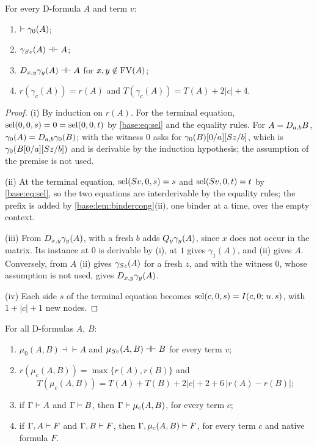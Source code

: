 \begin{lemma}
\label{base:lem:agate}
For every D-formula $A$ and term $v$:
\begin{enumerate}[label=\textup{(\roman*)}]
\item $\vdash\gamma_0(A)$;
\item $\gamma_{S v}(A)\dashv\vdash A$;
\item $D_{x,y}\gamma_y(A)\dashv\vdash A$ for $x,y\notin\operatorname{FV}(A)$;
\item $r(\gamma_c(A))=r(A)$ and $T(\gamma_c(A))=T(A)+2|c|+4$.
\end{enumerate}
\end{lemma}

\begin{proof}
(i) By induction on $r(A)$.  For the terminal equation,
$\operatorname{sel}(0,0,s)=0=\operatorname{sel}(0,0,t)$ by \eqref{base:eq:sel} and the equality rules.
For $A=D_{a,b}B$, $\gamma_0(A)=D_{a,b}\gamma_0(B)$;  with the
witness $0$ asks for $\gamma_0(B)[0/a][S z/b]$, which is
$\gamma_0(B[0/a][S z/b])$ and is derivable by the induction
hypothesis; the assumption of the premise is not used.

(ii) At the terminal equation, $\operatorname{sel}(S v,0,s)=s$ and
$\operatorname{sel}(S v,0,t)=t$ by \eqref{base:eq:sel}, so the two equations are
interderivable by the equality rules; the prefix is added by
\cref{base:lem:bindercong}(ii), one binder at a time, over the empty context.

(iii) From $D_{x,y}\gamma_y(A)$,  with a fresh $b$ adds
$Q_{y}\gamma_y(A)$, since $x$ does not occur in the matrix.  Its instance at
$0$ is derivable by (i),  at $1$ gives $\gamma_1(A)$, and (ii)
gives $A$.  Conversely, from $A$ (ii) gives $\gamma_{S z}(A)$ for a fresh
$z$, and  with the witness $0$, whose assumption is not used,
gives $D_{x,y}\gamma_y(A)$.

(iv) Each side $s$ of the terminal equation becomes
$\operatorname{sel}(c,0,s)=I(c,0;\,u.\,s)$, with $1+|c|+1$ new nodes.
\end{proof}

\begin{lemma}
\label{base:lem:amix}
For all D-formulas $A$, $B$:
\begin{enumerate}[label=\textup{(\roman*)}]
\item $\mu_0(A,B)\dashv\vdash A$ and $\mu_{S v}(A,B)\dashv\vdash B$ for
 every term $v$;
\item $r(\mu_c(A,B))=\max\{r(A),r(B)\}$ and
 \[
  T(\mu_c(A,B))=T(A)+T(B)+2|c|+2+6\,|r(A)-r(B)|;
 \]
\item if $\Gamma\vdash A$ and $\Gamma\vdash B$, then
 $\Gamma\vdash\mu_c(A,B)$, for every term $c$;
\item if $\Gamma,A\vdash F$ and $\Gamma,B\vdash F$, then
 $\Gamma,\mu_c(A,B)\vdash F$, for every term $c$ and native formula $F$.
\end{enumerate}
\end{lemma}

